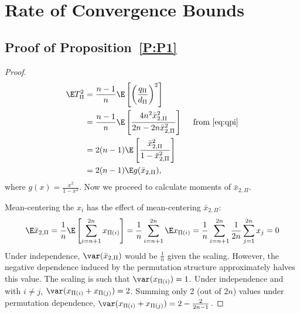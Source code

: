 \chapter{Rate of Convergence Bounds}
\label{A:stein-proof-app}
\section{Proof of Proposition~\ref{P:P1}}
\begin{proof}
  \begin{align}
    \E T_{\Pi}^2
    &= \frac{n-1}{n} \E \left [ \left ( \frac{q_\Pi}{d_\Pi} \right )^2 \right ] \\
    &= \frac{n-1}{n} \E \left [\frac{
        4 n^2\bar{x}_{2,\Pi}^2}{2n-2n\bar{x}_{2,\Pi}^2} \right ] \quad \text{ from } \eqref{eq:qpi}
    \nonumber \\
    &= 2(n-1)\E \left [\frac{
        \bar{x}_{2,\Pi}^2}{1-\bar{x}_{2,\Pi}^2} \right ] \nonumber \\
    &= 2(n-1) \E g(\bar{x}_{2,\Pi}), \label{def:varT}
  \end{align}
  where $g(x) = \frac{x^2}{1-x^2}$. Now we proceed to calculate moments of $\bar{x}_{2,\Pi}$.

  Mean-centering the $x_{i}$ has the effect of mean-centering $\bar{x}_{2,\Pi}$:
  \begin{equation*}
    \E \bar{x}_{2,\Pi} =
    \frac{1}{n} \E \left [ \sum_{i=n+1}^{2n} x_{\Pi(i)} \right ] =
    \frac{1}{n} \sum_{i=n+1}^{2n} \E x_{\Pi(i)} =
    \frac{1}{n} \sum_{i=n+1}^{2n} \frac{1}{2n} \sum_{j=1}^{2n} x_{j} = 0
  \end{equation*}
  Under independence, $\var(\bar{x}_{2,\Pi})$ would be $\frac{1}{n}$ given
  the scaling.  However, the negative dependence induced by the
  permutation structure approximately halves this value.
  The scaling is such that $\var(x_{\Pi(i)}) = 1$.  Under independence and
  with $i \neq j$, $\var(x_{\Pi(i)} + x_{\Pi(j)}) = 2$.  Summing only 2 (out of $2n$)
  values under permutation dependence, $\var(x_{\Pi(i)} + x_{\Pi(j)}) = 2 - \frac{2}{2n-1}$.


\end{proof}
